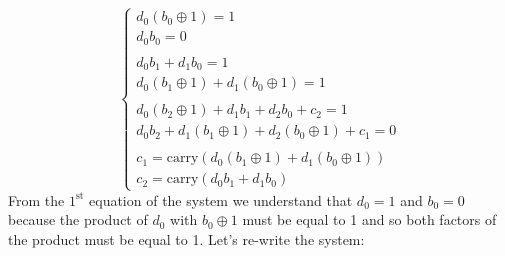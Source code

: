 \begin{equation*}
    \begin{cases}
        
        d_0(b_0\oplus1)=1\\
        d_0b_0=0\\\\
        
        d_0b_1+d_1b_0=1\\
        d_0(b_1\oplus1)+d_1(b_0\oplus1)=1\\\\
        
        d_0(b_2\oplus1)+d_1b_1+d_2b_0+c_2=1\\
        d_0b_2+d_1(b_1\oplus1)+d_2(b_0\oplus1)+c_1=0\\\\

        c_1=\text{carry}(d_0(b_1\oplus1)+d_1(b_0\oplus1))\\
        c_2=\text{carry}(d_0b_1+d_1b_0)
        
    \end{cases}
\end{equation*}
From the $1^{\text{st}}$ equation of the system we understand that $d_0=1$ and $b_0=0$ because the product of $d_0$ with $b_0\oplus1$ must be equal to 1 and so both factors of the product must be equal to 1. Let's re-write the system:
